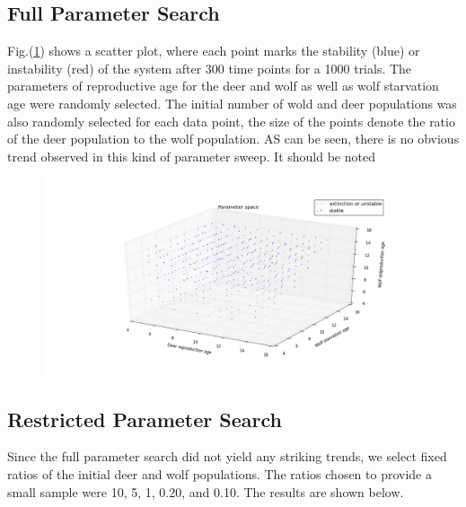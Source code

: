 \documentclass[a4paper,12pt]{article}
\begin{document}
\subsection{Full Parameter Search}
\indent Fig.(\ref{full_para}) shows a scatter plot, where each point marks the stability (blue) or instability (red) of the system after 300 time points for a 1000 trials. The parameters of reproductive age for the deer and wolf as well as wolf starvation age were randomly selected.
The initial number of wold and deer populations was also randomly selected for each data point, the size of the points denote the ratio of the deer population to the wolf population.
AS can be seen, there is no obvious trend observed in this kind of parameter sweep. It should be noted
\begin{figure}
	\includegraphics[width = 1\textwidth]{./pics/Eco_All_param_front.png}
	\label{full_para}
\end{figure}
\subsection{Restricted Parameter Search}
\indent
\indent Since the full parameter search did not yield any striking trends, we select fixed ratios of the initial deer and wolf populations.  The ratios chosen to provide 
a small sample were 10, 5, 1, 0.20, and 0.10. The results are shown below.
\end{document}
